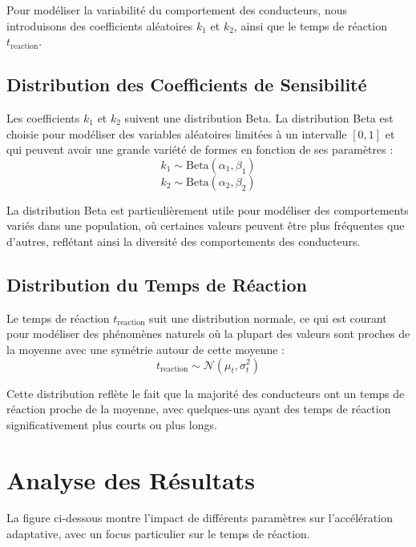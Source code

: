 \documentclass{article}
\begin{document}
Pour modéliser la variabilité du comportement des conducteurs, nous introduisons des coefficients aléatoires \(k_1\) et \(k_2\), ainsi que le temps de réaction \(t_{\text{reaction}}\).

\subsection{Distribution des Coefficients de Sensibilité}

Les coefficients \(k_1\) et \(k_2\) suivent une distribution Beta. La distribution Beta est choisie pour modéliser des variables aléatoires limitées à un intervalle \([0, 1]\) et qui peuvent avoir une grande variété de formes en fonction de ses paramètres :
\[
k_1 \sim \text{Beta}(\alpha_1, \beta_1)
\]
\[
k_2 \sim \text{Beta}(\alpha_2, \beta_2)
\]

La distribution Beta est particulièrement utile pour modéliser des comportements variés dans une population, où certaines valeurs peuvent être plus fréquentes que d'autres, reflétant ainsi la diversité des comportements des conducteurs.

\subsection{Distribution du Temps de Réaction}

Le temps de réaction \(t_{\text{reaction}}\) suit une distribution normale, ce qui est courant pour modéliser des phénomènes naturels où la plupart des valeurs sont proches de la moyenne avec une symétrie autour de cette moyenne :
\[
t_{\text{reaction}} \sim \mathcal{N}(\mu_t, \sigma_t^2)
\]

Cette distribution reflète le fait que la majorité des conducteurs ont un temps de réaction proche de la moyenne, avec quelques-uns ayant des temps de réaction significativement plus courts ou plus longs.

\section{Analyse des Résultats}

La figure ci-dessous montre l'impact de différents paramètres sur l'accélération adaptative, avec un focus particulier sur le temps de réaction.
\end{document}
